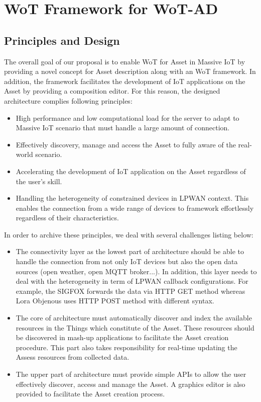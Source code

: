 \section{WoT Framework for WoT-AD}
\subsection{Principles and Design}
The overall goal of our proposal is to enable WoT for Asset in Massive IoT by providing a novel concept for Asset description along with an WoT framework. In addition, the framework facilitates the development of IoT applications on the Asset by providing a composition editor. For this reason, the designed architecture complies following principles:
\begin{itemize}
	\item High performance and low computational load for the server to adapt to Massive IoT scenario that must handle a large amount of connection.
	\item Effectively discovery, manage and access the Asset to fully aware of the real-world scenario. 
	\item Accelerating the development of IoT application on the Asset regardless of the user's skill.
	\item Handling the heterogeneity of constrained devices in LPWAN context. This enables the connection from a wide range of devices to framework effortlessly regardless of their characteristics. 
\end{itemize}
In order to archive these principles, we deal with several challenges listing below: 
\begin{itemize}
	\item The connectivity layer as the lowest part of architecture should be able to handle the connection from not only IoT devices but also the open data sources (open weather, open MQTT broker...). In addition, this layer needs to deal with the heterogeneity in term of LPWAN callback configurations. For example, the SIGFOX forwards the data via HTTP GET method whereas Lora Objenous uses HTTP POST method with different syntax. 
	\item The core of architecture must automatically discover and index the available resources in the Things which constitute of the Asset. These resources should be discovered in mash-up applications to facilitate the Asset creation procedure. This part also takes responsibility for real-time updating the Assess resources from collected data.
	\item The upper part of architecture must provide simple APIs to allow the user effectively discover, access and manage the Asset. A graphics editor is also provided to facilitate the Asset creation process.
\end{itemize}

